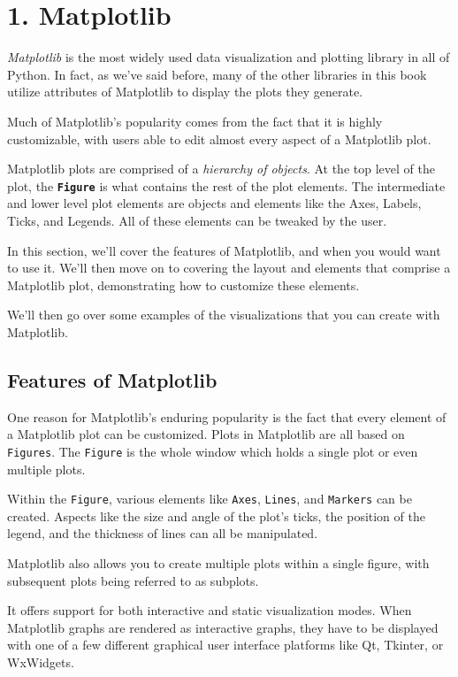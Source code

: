 \documentclass[11pt]{article}
\begin{document}
    \section{1. Matplotlib}\label{matplotlib}

\emph{Matplotlib} is the most widely used data visualization and
plotting library in all of Python. In fact, as we've said before, many
of the other libraries in this book utilize attributes of Matplotlib to
display the plots they generate.

Much of Matplotlib's popularity comes from the fact that it is highly
customizable, with users able to edit almost every aspect of a
Matplotlib plot.

Matplotlib plots are comprised of a \emph{hierarchy of objects}. At the
top level of the plot, the \textbf{\texttt{Figure}} is what contains the
rest of the plot elements. The intermediate and lower level plot
elements are objects and elements like the Axes, Labels, Ticks, and
Legends. All of these elements can be tweaked by the user.

In this section, we'll cover the features of Matplotlib, and when you
would want to use it. We'll then move on to covering the layout and
elements that comprise a Matplotlib plot, demonstrating how to customize
these elements.

We'll then go over some examples of the visualizations that you can
create with Matplotlib.

\subsection{Features of Matplotlib}\label{features-of-matplotlib}

One reason for Matplotlib's enduring popularity is the fact that every
element of a Matplotlib plot can be customized. Plots in Matplotlib are
all based on \texttt{Figures}. The \texttt{Figure} is the whole window
which holds a single plot or even multiple plots.

Within the \texttt{Figure}, various elements like \texttt{Axes},
\texttt{Lines}, and \texttt{Markers} can be created. Aspects like the
size and angle of the plot's ticks, the position of the legend, and the
thickness of lines can all be manipulated.

Matplotlib also allows you to create multiple plots within a single
figure, with subsequent plots being referred to as subplots.

It offers support for both interactive and static visualization modes.
When Matplotlib graphs are rendered as interactive graphs, they have to
be displayed with one of a few different graphical user interface
platforms like Qt, Tkinter, or WxWidgets.
\end{document}

